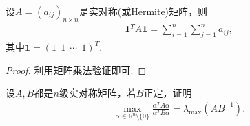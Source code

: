 \documentclass[../../main.tex]{subfiles}%
\begin{document}
\begin{proposition}\label{proposition:对称阵所有元素之和就是一个二次型}
设$A=(a_{ij})_{n\times n}$是实对称(或Hermite)矩阵，则
\begin{align*}
\mathbf{1}^T A \mathbf{1} = \sum_{i=1}^n \sum_{j=1}^n a_{ij},
\end{align*}
其中$\mathbf{1}=(1\ \ 1\ \ \cdots\ \ 1)^T$.
\end{proposition}
\begin{proof}
利用矩阵乘法验证即可.
\end{proof}

\begin{proposition}\label{proposition:两个正定二次型比值的最大值}
设$A,B$都是$n$级实对称矩阵，若$B$正定，证明
\begin{align*}
\max_{\alpha\in\mathbb{R}^n\setminus\{0\}} \frac{\alpha^TA\alpha}{\alpha^TB\alpha} = \lambda_{\max}(AB^{-1}).
\end{align*}
\end{proposition}
\end{document}
